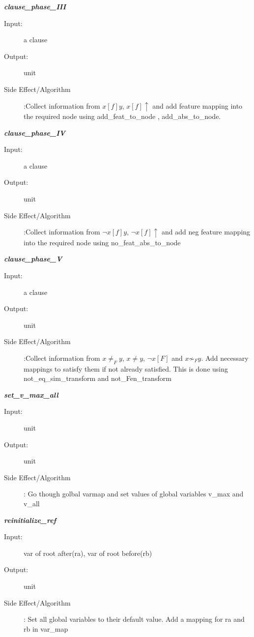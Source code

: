 \documentclass[12pt]{article}
\begin{document}
\begin{description}
\item \textbf{\textit{clause\_phase\_III}}
\begin{description}
    \item[Input:] a clause
    \item[Output:] unit
    \item[Side Effect/Algorithm]:Collect information from  $x[f]y$,  $x[f]\uparrow$ and add feature mapping into the required node using add\_feat\_to\_node , add\_abs\_to\_node.
\end{description}



\item \textbf{\textit{clause\_phase\_IV}}
\begin{description}
    \item[Input:] a clause
    \item[Output:] unit
    \item[Side Effect/Algorithm]:Collect information from  $\lnot x[f]y$,  $\lnot x[f]\uparrow$ and add neg feature mapping into the required node using no\_feat\_abs\_to\_node
\end{description}

\item \textbf{\textit{clause\_phase\_V}}
\begin{description}
    \item[Input:] a clause
    \item[Output:] unit
    \item[Side Effect/Algorithm]:Collect information from  $x\neq_F y $, $x\neq y $,  $\lnot x[F]$ and $ x \not\sim_F y$. Add necessary mappings to satisfy them if not already satisfied. This is done using not\_eq\_sim\_transform and not\_Fen\_transform
\end{description}

\item \textbf{\textit{set\_v\_max\_all}}
\begin{description}
    \item[Input:] unit
    \item[Output:] unit
    \item[Side Effect/Algorithm]: Go though golbal varmap and set values of global variables v\_max and v\_all
\end{description}

\item \textbf{\textit{reinitialize\_ref}}
\begin{description}
    \item[Input:] var of root after(ra), var of root before(rb)
    \item[Output:] unit
    \item[Side Effect/Algorithm]: Set all global variables to their default value. Add a mapping for ra and rb in var\_map
\end{description}


\end{description}
\end{document}

